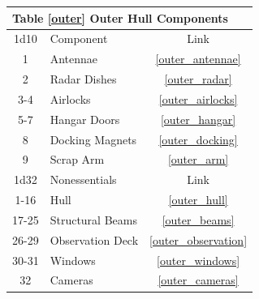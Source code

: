 \documentclass[a4paper]{article}
\begin{document}
\vspace{0.5cm} \hspace{0.25\linewidth}
\begin{tabular}{@{} | c | l | c | @{}}
\toprule
\multicolumn{3}{|l|}{Table \ref{outer} Outer Hull Components} \\
\toprule
1d10 & Component & Link \\
\midrule
1 & Antennae & \ref{outer_antennae} \\
2 & Radar Dishes & \ref{outer_radar} \\
3-4 & Airlocks & \ref{outer_airlocks} \\
5-7 & Hangar Doors & \ref{outer_hangar} \\
8 & Docking Magnets & \ref{outer_docking} \\
9 & Scrap Arm & \ref{outer_arm} \\
\midrule
1d32 & Nonessentials & Link \\
\midrule
1-16 & Hull & \ref{outer_hull} \\
17-25 & Structural Beams & \ref{outer_beams} \\
26-29 & Observation Deck & \ref{outer_observation} \\
30-31 & Windows & \ref{outer_windows} \\ 
32 & Cameras & \ref{outer_cameras} \\
\bottomrule
\end{tabular}
\end{document}
